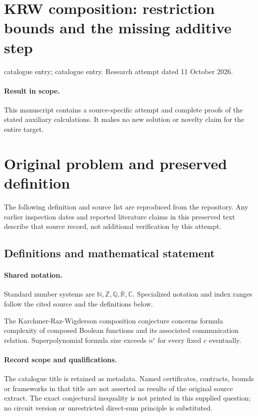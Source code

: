 \documentclass[11pt]{article}
\begin{document}
\section*{KRW composition: restriction bounds and the missing additive step}
\noindent catalogue entry; catalogue entry. Research attempt dated 11 October 2026.
\paragraph{Result in scope.}This manuscript contains a source-specific attempt and complete proofs of the stated auxiliary calculations. It makes no new solution or novelty claim for the entire target.
\section{Original problem and preserved definition}
The following definition and source list are reproduced from the repository. Any earlier inspection dates and reported literature claims in this preserved text describe that source record, not additional verification by this attempt.
\subsection{Definitions and mathematical statement}

\paragraph{Shared notation.}Standard number systems are $\mathbb N,\mathbb Z,\mathbb Q,\mathbb R,\mathbb C$. Specialized notation and index ranges follow the cited source and the definitions below.


The Karchmer-Raz-Wigderson composition conjecture concerns formula complexity of composed Boolean functions and its associated communication relation. Superpolynomial formula size exceeds $n^c$ for every fixed $c$ eventually.
\paragraph{Record scope and qualifications.}
The catalogue title is retained as metadata. Named certificates, contracts, bounds or frameworks in that title are not asserted as results of the original source extract.
The exact conjectural inequality is not printed in this supplied question; no circuit version or unrestricted direct-sum principle is substituted.
\end{document}
